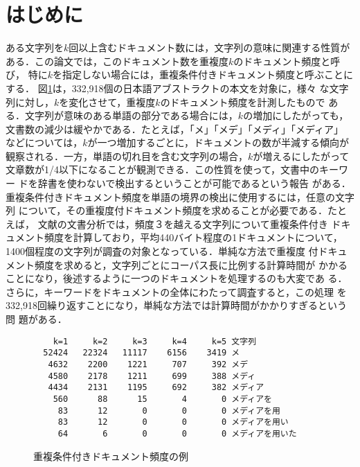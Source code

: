 

\maketitle
\thispagestyle{empty}

\section{はじめに}

ある文字列を$k$回以上含むドキュメント数には，文字列の意味に関連する性質が
ある．この論文では，このドキュメント数を重複度$k$のドキュメント頻度と呼び，
特に$k$を指定しない場合には，重複条件付きドキュメント頻度と呼ぶことにする．
図\ref{dfn-sample}は，332,918個の日本語アブストラクトの本文を対象に，様々
な文字列に対し，$k$を変化させて，重複度$k$のドキュメント頻度を計測したもので
ある．文字列が意味のある単語の部分である場合には，$k$の増加にしたがっても，
文書数の減少は緩やかである．たとえば，「メ」「メデ」「メディ」「メディア」
などについては，$k$が一つ増加するごとに，ドキュメントの数が半減する傾向が
観察される．一方，単語の切れ目を含む文字列の場合，$k$が増えるにしたがって
文章数が1/4以下になることが観測できる．この性質を使って，文書中のキーワー
ドを辞書を使わないで検出するということが可能であるという報告
\cite{Keyword}がある．
重複条件付きドキュメント頻度を単語の境界の検出に使用するには，任意の文字列
について，その重複度付ドキュメント頻度を求めることが必要である．たとえば，
文献\cite{Keyword}の文書分析では，頻度３を越える文字列について重複条件付き
ドキュメント頻度を計算しており，平均440バイト程度の1ドキュメントについて，
1400個程度の文字列が調査の対象となっている．単純な方法で重複度
付ドキュメント頻度を求めると，文字列ごとにコーパス長に比例する計算時間が
かかることになり，後述するように一つのドキュメントを処理するのも大変であ
る．さらに，キーワードをドキュメントの全体にわたって調査すると，この処理
を332,918回繰り返すことになり，単純な方法では計算時間がかかりすぎるという問
題がある．

\begin{figure}[htbp]
\begin{center}
\begin{verbatim}
    k=1     k=2     k=3     k=4     k=5 文字列
  52424   22324   11117    6156    3419 メ
   4632    2200    1221     707     392 メデ
   4580    2178    1211     699     388 メディ
   4434    2131    1195     692     382 メディア
    560      88      15       4       0 メディアを
     83      12       0       0       0 メディアを用
     83      12       0       0       0 メディアを用い
     64       6       0       0       0 メディアを用いた
\end{verbatim}
\caption{重複条件付きドキュメント頻度の例}
\label{dfn-sample}
\end{center}
\end{figure}


